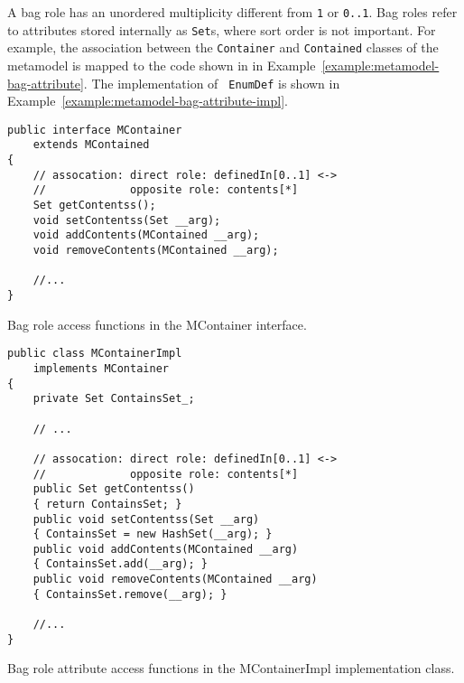 A bag role has an unordered multiplicity different from {\tt 1} or {\tt 0..1}.
Bag roles refer to attributes stored internally as {\tt Set}s, where sort order
is not important. For example, the association between the {\tt Container} and
{\tt Contained} classes of the metamodel is mapped to the code shown in in
Example~\ref{example:metamodel-bag-attribute}. The implementation of {\tt
EnumDef} is shown in Example~\ref{example:metamodel-bag-attribute-impl}.

\begin{Example}
\begin{minifbox}
\begin{small}
\begin{verbatim}
public interface MContainer
    extends MContained
{
    // assocation: direct role: definedIn[0..1] <->
    //             opposite role: contents[*]
    Set getContentss();
    void setContentss(Set __arg);
    void addContents(MContained __arg);
    void removeContents(MContained __arg);

    //...
}
\end{verbatim}
\end{small}
\end{minifbox}
\caption{Bag role access functions in the MContainer interface.}
\label{example:metamodel-bag-attribute}
\end{Example}

\begin{Example}
\begin{minifbox}
\begin{small}
\begin{verbatim}
public class MContainerImpl
    implements MContainer
{
    private Set ContainsSet_;

    // ...

    // assocation: direct role: definedIn[0..1] <->
    //             opposite role: contents[*]
    public Set getContentss()
    { return ContainsSet; }
    public void setContentss(Set __arg)
    { ContainsSet = new HashSet(__arg); }
    public void addContents(MContained __arg)
    { ContainsSet.add(__arg); }
    public void removeContents(MContained __arg)
    { ContainsSet.remove(__arg); }

    //...
}
\end{verbatim}
\end{small}
\end{minifbox}
\caption{Bag role attribute access functions in the MContainerImpl
implementation class.}
\label{example:metamodel-bag-attribute-impl}
\end{Example}


